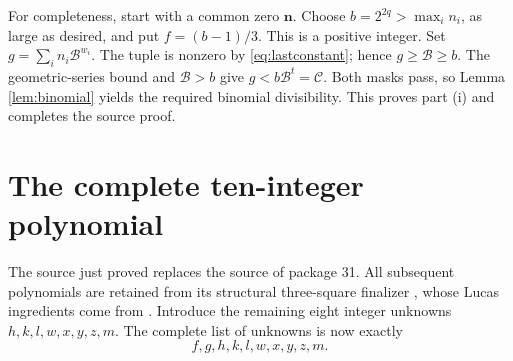 \documentclass[11pt]{article}
\newcommand{\BB}{\mathcal B}
\newcommand{\capC}{\mathscr C}
\theoremstyle{definition}
\theoremstyle{remark}
\numberwithin{equation}{section}
\begin{document}
For completeness, start with a common zero \(\mathbf n\). Choose
\(b=2^{2q}>\max_i n_i\), as large as desired, and put \(f=(b-1)/3\).
This is a positive integer. Set \(g=\sum_i n_i\BB^{w_i}\).
The tuple is nonzero by \eqref{eq:lastconstant}; hence
\(g\ge\BB\ge b\). The geometric-series bound and \(\BB>b\) give
\(g<b\BB^t=\capC\). Both masks pass, so Lemma \ref{lem:binomial} yields
the required binomial divisibility. This proves part (i) and completes
the source proof.

\section{The complete ten-integer polynomial}
\label{sec:equation}

The source just proved replaces the source of package 31. All subsequent
polynomials are retained from its structural three-square finalizer
\cite{package31}, whose Lucas ingredients come from \cite{sun2021,sun2026}.
Introduce the remaining eight integer unknowns \(h,k,l,w,x,y,z,m\).
The complete list of unknowns is now exactly
\[
 f,g,h,k,l,w,x,y,z,m.
\]
\end{document}
